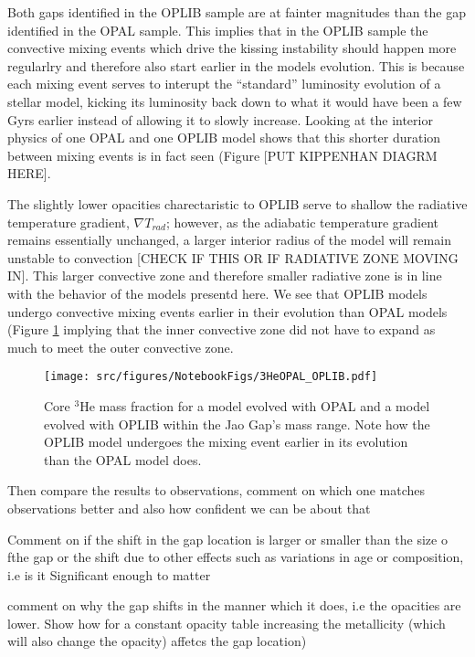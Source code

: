 Both gaps identified in the OPLIB sample are at fainter magnitudes than the gap
identified in the OPAL sample. This implies that in the OPLIB sample the
convective mixing events which drive the kissing instability should happen more
regularlry and therefore also start earlier in the models evolution. This is
because each mixing event serves to interupt the ``standard'' luminosity
evolution of a stellar model, kicking its luminosity back down to what it would
have been a few Gyrs earlier instead of allowing it to slowly increase. Looking
at the interior physics of one OPAL and one OPLIB model shows that this shorter
duration between mixing events is in fact seen (Figure {\color{red} [PUT
KIPPENHAN DIAGRM HERE]}.

The slightly lower opacities charectaristic to OPLIB serve to shallow the
radiative temperature gradient, $\nabla T_{rad}$; however, as the adiabatic
temperature gradient remains essentially unchanged, a larger interior radius of
the model will remain unstable to convection {\color{red}[CHECK IF THIS OR IF
RADIATIVE ZONE MOVING IN]}. This larger convective zone and therefore smaller
radiative zone is in line with the behavior of the models presentd here. We see
that OPLIB models undergo convective mixing events earlier in their evolution
than OPAL models (Figure \ref{fig:OPALOPLIB3He} implying that the inner
convective zone did not have to expand as much to meet the outer convective
zone. 

\begin{figure}
	\centering
	\texttt{[image: src/figures/NotebookFigs/3HeOPAL\_OPLIB.pdf]}
	\caption{Core $^{3}$He mass fraction for a model evolved with OPAL and a
	model evolved with OPLIB within the Jao Gap's mass range. Note how the
	OPLIB model undergoes the mixing event earlier in its evolution than the
	OPAL model does.}
	\label{fig:OPALOPLIB3He}
\end{figure}

{\color{red} Then compare the results to observations, comment on which one
matches observations better and also how confident we can be about that}

{\color{red} Comment on if the shift in the gap location is larger or smaller
than the size o fthe gap or the shift due to other effects such as variations
in age or composition, i.e is it Significant enough to matter}

{\color{red} comment on why the gap shifts in the manner which it does, i.e the
opacities are lower. Show how for a constant opacity table increasing the
metallicity (which will also change the opacity) affetcs the gap location)}
